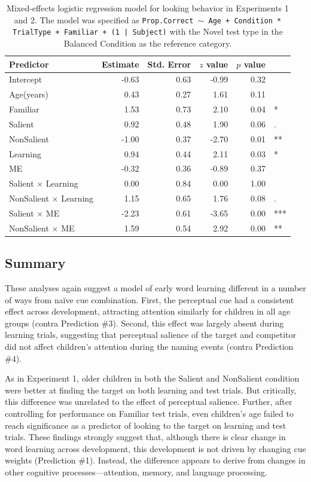 \documentclass[man,floatsintext]{apa6}
\begin{document}
\begin{table}[tb]
\centering
\begin{tabular}{lrrrrl}
 Predictor & Estimate & Std. Error & $z$ value & $p$ value &  \\ 
  \hline
Intercept & -0.63 & 0.63 & -0.99 & 0.32 &  \\ 
  Age(years) & 0.43 & 0.27 & 1.61 & 0.11 &  \\ 
  Familiar & 1.53 & 0.73 & 2.10 & 0.04 & * \\ 
  Salient & 0.92 & 0.48 & 1.90 & 0.06 & . \\ 
  NonSalient & -1.00 & 0.37 & -2.70 & 0.01 & ** \\ 
  Learning & 0.94 & 0.44 & 2.11 & 0.03 & * \\ 
  ME & -0.32 & 0.36 & -0.89 & 0.37 &  \\ 
  Salient $\times$ Learning & 0.00 & 0.84 & 0.00 & 1.00 &  \\ 
  NonSalient $\times$ Learning & 1.15 & 0.65 & 1.76 & 0.08 & . \\ 
  Salient $\times$ ME & -2.23 & 0.61 & -3.65 & 0.00 & *** \\ 
  NonSalient $\times$ ME & 1.59 & 0.54 & 2.92 & 0.00 & ** \\ 
   \hline
\end{tabular}
\vspace{6pt}
\caption{\label{tab:model_table} Mixed-effects logistic regression model for looking behavior in Experiments 1 and 2. The model was specified as \small{\tt{Prop.Correct $\sim$ Age + Condition * TrialType + Familiar + (1 | Subject)}} with the Novel test type in the Balanced Condition as the reference category.}
\end{table}

\subsection{Summary}

These analyses again suggest a model of early word learning different in a number of ways from na\"{i}ve cue combination. First, the perceptual cue had a consistent effect across development, attracting attention similarly for children in all age groups (contra Prediction \#3). Second, this effect was largely absent during learning trials, suggesting that perceptual salience of the target and competitor did not affect children's attention during the naming events (contra Prediction \#4). 

As in Experiment 1, older children in both the Salient and NonSalient condition were better at finding the target on both learning and test trials. But critically, this difference was unrelated to the effect of perceptual salience. Further, after controlling for performance on Familiar test trials, even children's age failed to reach significance as a predictor of looking to the target on learning and test trials. These findings strongly suggest that, although there is clear change in word learning across development, this development is not driven by changing cue weights (Prediction \#1). Instead, the difference appears to derive from changes in other cognitive processes---attention, memory, and language processing.
\end{document}
